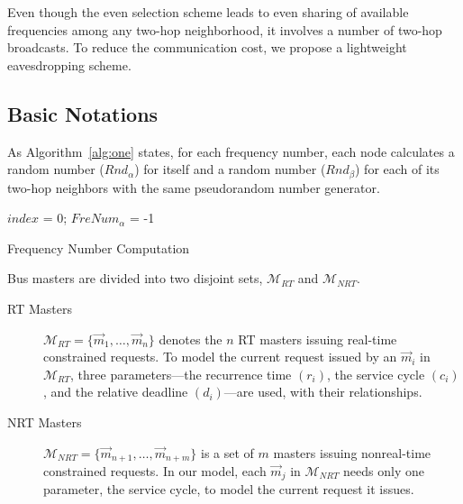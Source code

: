 Even though the even selection scheme leads to even sharing of
available frequencies among any two-hop neighborhood, it involves a
number of two-hop broadcasts. To reduce the communication cost, we
propose a lightweight eavesdropping scheme.

\subsection{Basic Notations}

As Algorithm~\ref{alg:one} states, for each frequency
number, each node calculates a random number (${\textit{Rnd}}_{\alpha}$) for
itself and a random number (${\textit{Rnd}}_{\beta}$) for each of its two-hop
neighbors with the same pseudorandom number generator.

\begin{algorithm}[t]
\SetAlgoNoLine
{}
$index$ = 0; $FreNum_{\alpha}$ = -1\;
\caption{Frequency Number Computation}
\label{alg:one}
\end{algorithm}


Bus masters are divided into two disjoint sets, $\mathcal{M}_{RT}$
and $\mathcal{M}_{NRT}$.
\begin{description}
\item[RT Masters]
$\mathcal{M}_{RT}=\{ \vec{m}_{1},\dots,\vec{m}_{n}\}$ denotes the
$n$ RT masters issuing real-time constrained requests. To model the
current request issued by an $\vec{m}_{i}$ in $\mathcal{M}_{RT}$,
three parameters---the recurrence time $(r_i)$, the service cycle
$(c_i)$, and the relative deadline $(d_i)$---are used, with their
relationships.
\item[NRT Masters]
$\mathcal{M}_{NRT}=\{ \vec{m}_{n+1},\dots,\vec{m}_{n+m}\}$ is a set
of $m$ masters issuing nonreal-time constrained requests. In our
model, each $\vec{m}_{j}$ in $\mathcal{M}_{NRT}$ needs only one
parameter, the service cycle, to model the current request it
issues.
\end{description}

